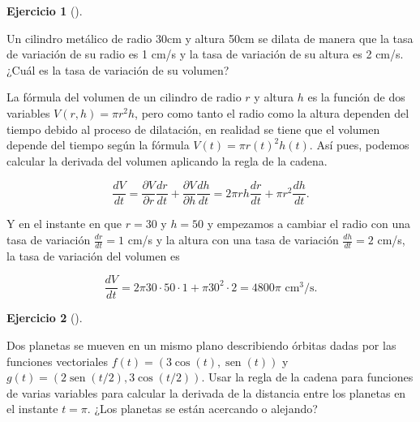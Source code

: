 \documentclass[
  a4paper,
]{scrreport}
\theoremstyle{definition}
\newtheorem{exercise}{Ejercicio}[chapter]
\theoremstyle{remark}
\begin{document}
\begin{exercise}[]\protect\hypertarget{exr-variacion-volumen-cilindro}{}\label{exr-variacion-volumen-cilindro}

Un cilindro metálico de radio 30cm y altura 50cm se dilata de manera que
la tasa de variación de su radio es 1 cm/s y la tasa de variación de su
altura es 2 cm/s. ¿Cuál es la tasa de variación de su volumen?

\end{exercise}

\begin{tcolorbox}[enhanced jigsaw, left=2mm, coltitle=black, colbacktitle=quarto-callout-tip-color!10!white, opacitybacktitle=0.6, colback=white, breakable, titlerule=0mm, toptitle=1mm, rightrule=.15mm, bottomtitle=1mm, bottomrule=.15mm, toprule=.15mm, leftrule=.75mm, arc=.35mm, opacityback=0, title=\textcolor{quarto-callout-tip-color}{\faLightbulb}\hspace{0.5em}{Solución}, colframe=quarto-callout-tip-color-frame]

La fórmula del volumen de un cilindro de radio \(r\) y altura \(h\) es
la función de dos variables \(V(r,h) = \pi r^2h\), pero como tanto el
radio como la altura dependen del tiempo debido al proceso de
dilatación, en realidad se tiene que el volumen depende del tiempo según
la fórmula \(V(t) = \pi r(t)^2 h(t)\). Así pues, podemos calcular la
derivada del volumen aplicando la regla de la cadena.

\[
\frac{dV}{dt}
= \frac{\partial V}{\partial r}\frac{dr}{dt} + \frac{\partial V}{\partial h}\frac{dh}{dt}
= 2\pi rh \frac{dr}{dt} + \pi r^2 \frac{dh}{dt}.
\]

Y en el instante en que \(r=30\) y \(h=50\) y empezamos a cambiar el
radio con una tasa de variación \(\frac{dr}{dt}=1\) cm/s y la altura con
una tasa de variación \(\frac{dh}{dt}=2\) cm/s, la tasa de variación del
volumen es

\[
\frac{dV}{dt}
= 2\pi 30\cdot 50\cdot 1 + \pi 30^2 \cdot 2 
= 4800 \pi \mbox{ cm$^3$/s}.
\]

\end{tcolorbox}

\begin{exercise}[]\protect\hypertarget{exr-distancia-planetas}{}\label{exr-distancia-planetas}

Dos planetas se mueven en un mismo plano describiendo órbitas dadas por
las funciones vectoriales \(f(t) = (3 \cos(t), \operatorname{sen}(t))\)
y \(g(t) = (2\operatorname{sen}(t/2), 3\cos(t/2))\). Usar la regla de la
cadena para funciones de varias variables para calcular la derivada de
la distancia entre los planetas en el instante \(t=\pi\). ¿Los planetas
se están acercando o alejando?

\end{exercise}
\end{document}

